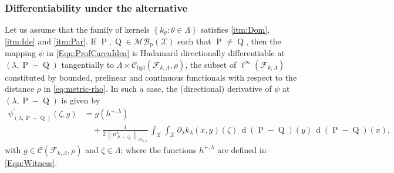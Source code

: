 		\subsubsection*{\color{orange} Differentiability under the alternative}
			\begin{Th}
				Let us assume that the family of kernels $\left\{k_{\theta}:\theta\in\Lambda\right\}$ satisfies \ref{itm:Dom}, \ref{itm:Ide} and \ref{itm:Par}. If $\operatorname{P},\operatorname{Q}\in\mathcal{MB}_{\operatorname{p}}(\mathcal{X})$ such that $\operatorname{P}\neq\operatorname{Q}$, then the mapping $\psi$ in \eqref{Eqn:ProfCarcaIdea} is Hadamard directionally differentiable at $(\lambda,\operatorname{P}-\operatorname{Q})$ tangentially to $\Lambda\times\mathcal{C}_{\operatorname{bpl}}\left(\mathcal{F}_{k,\Lambda},\rho\right)$,
				{\color{orange}the subset of $\ell^{\infty}\left(\mathcal{F}_{k,\Lambda}\right)$ constituted by bounded, prelinear and continuous functionals with respect to the distance $\rho$ in \eqref{eq:metric-rho}}. In such a case, the (directional) derivative of $\psi$ at $(\lambda,\operatorname{P}-\operatorname{Q})$ is given by
				\begin{equation}\label{Eqn:psi_prime1}
					\begin{aligned}
						\psi_{(\lambda,\operatorname{P}-\operatorname{Q})}^{\prime}(\zeta,g)&=g\left(h^{+,\lambda}\right)
						\\
						&\quad+\frac{1}{2\,\left\|\mu_{\operatorname{P}-\operatorname{Q}}^{\lambda}\right\|_{\mathcal{H}_{k,\lambda}}}\,\int_{\mathcal{X}}\int_{\mathcal{X}}\partial_{\lambda}k_{\lambda}(x,y)(\zeta)\,\operatorname{d}(\operatorname{P}-\operatorname{Q})(y)\,\operatorname{d}(\operatorname{P}-\operatorname{Q})(x),
					\end{aligned}
				\end{equation}
				with $g\in\mathcal{C}\left(\mathcal{F}_{k,\Lambda},\rho\right)$ and $\zeta\in\Lambda$; where the functions $h^{+,\lambda}$ are defined in \eqref{Eqn:Witness}.
			\end{Th}
